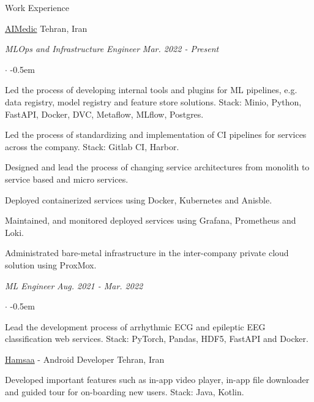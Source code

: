 \documentclass[../professional-cv.tex]{subfiles}
\begin{document}
	\begin{rSection}{Work Experience}
		
		\begin{rWorkSection}
			{\href{https://aimedic.co/}{AIMedic}}
			{Tehran, Iran}
			
			\vspace{-1em}
			{\em MLOps and Infrastructure Engineer} \hfill {\em Mar. 2022 - Present} \hspace{10pt}
			\normalfont
			\begin{list}{$\cdot$}{\leftmargin=10pt\normalfont \rightmargin=20pt}
				\itemsep -0.5em
				\item Led the process of developing internal tools and plugins for ML pipelines, e.g. data registry, model registry and feature store solutions. Stack: Minio, Python, FastAPI, Docker, DVC, Metaflow, MLflow, Postgres.
				\item Led the process of standardizing and implementation of CI pipelines for services across the company. Stack: Gitlab CI, Harbor.
				\item Designed and lead the process of changing service architectures from monolith to service based and micro services.
				\item Deployed containerized services using Docker, Kubernetes and Anisble.
				\item Maintained, and monitored deployed services using Grafana, Prometheus and Loki.
				\item Administrated bare-metal infrastructure in the inter-company private cloud solution using ProxMox.
						
			\end{list}
			{\em ML Engineer} \hfill {\em Aug. 2021 - Mar. 2022}
			\normalfont
			\begin{list}{$\cdot$}{\leftmargin=10pt\normalfont \rightmargin=20pt}
				\itemsep -0.5em
				\item Lead the development process of arrhythmic ECG and epileptic EEG classification web services. Stack: PyTorch, Pandas, HDF5, FastAPI and Docker.
			\end{list}
		\end{rWorkSection}
		
		\begin{rSubsection}
			{\href{https://hamsaa.ir}{Hamsaa}}
			{  -  }
			{Android Developer}
			{Tehran, Iran}
			
			\item Developed important features such as in-app video player, in-app file downloader and guided tour for on-boarding new users. Stack: Java, Kotlin.
			
		\end{rSubsection}

		
	
	\end{rSection}
\end{document}

